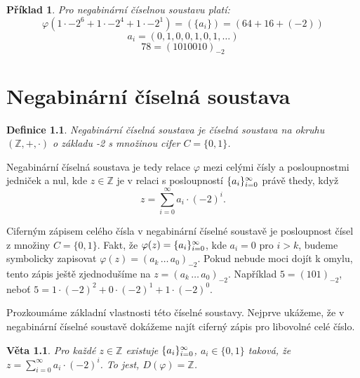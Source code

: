 \documentclass[12pt]{book}
\newtheorem{definice}{Definice}
\newtheorem{veta}{Věta}
\newtheorem*{pr}{Příklad}
\begin{document}
\begin{pr}
	Pro negabinární číselnou soustavu platí:
	$$\varphi(1\cdot-2^6+1\cdot-2^4+1\cdot-2^1)=(\{a_i\})=(64+16+(-2))$$
	$${a_i}=(0,1,0,0,1,0,1,\dots) $$
	$$78 =(1010010)_{-2}$$
\end{pr}




\chapter{Negabinární číselná soustava}

\begin{definice}
	Negabinární číselná soustava je číselná soustava na okruhu $(\mathbb{Z},+,\cdot)$ o základu -2 s množinou cifer $C=\{0,1\}$.
\end{definice}

Negabinární číselná soustava je tedy relace $\varphi$ mezi celými čísly a posloupnostmi jedniček a nul, kde $z \in \mathbb{Z}$ je v relaci s posloupností $\{a_i\}_{i=0}^{\infty}$ právě thedy, když 
$$z=\sum_{i=0}^{\infty}a_i\cdot(-2)^i.$$

Ciferným zápisem celého čísla v negabinární číselné soustavě je posloupnost čísel z množiny $C=\{0,1\}$. Fakt, že $\varphi(z) = \{a_i\}_{i=0}^{\infty}$, kde $a_i = 0$ pro $i > k$, budeme symbolicky zapisovat $\varphi(z) = (a_k\,\dots\, a_0)_{-2}$. Pokud nebude moci dojít k omylu, tento zápis ještě zjednodušíme na $z = (a_k\,\dots\, a_0)_{-2}$. Například $5 = (101)_{-2}$, neboť $5 = 1\cdot(-2)^2 + 0\cdot(-2)^1 + 1\cdot(-2)^0$.


Prozkoumáme základní vlastnosti této číselné soustavy. Nejprve ukážeme, že v negabinární číselné soustavě dokážeme najít ciferný zápis pro libovolné celé číslo.

\begin{veta}\label{negaDF}
	Pro každé $z \in \mathbb{Z}$ existuje $\{a_i\}_{i=0}^{\infty}$, $a_i\in \{0,1\}$ taková, že
     $z=\sum_{i=0}^{\infty}a_i\cdot(-2)^i$. To jest, $D(\varphi)=\mathbb{Z}$.
\end{veta}
\end{document}
